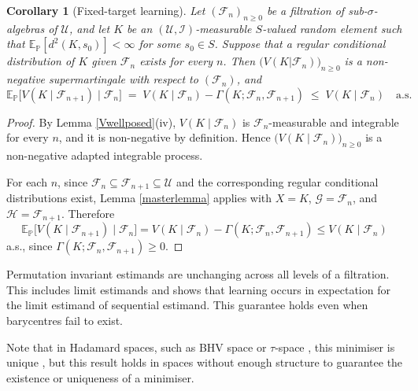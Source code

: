 \documentclass{article}
\newcommand{\E}{\mathbb{E}_{\mathbb{P}}}
\newcommand{\F}{\mathcal{F}}
\newcommand{\1}{\mathbbm{1}}
\newtheorem{cor}{Corollary}
\begin{document}
\begin{cor}[Fixed-target learning]
\label{fixedlearning}
Let $(\mathcal F_n)_{n\ge0}$ be a filtration of sub-$\sigma$-algebras of $\mathcal U$, and let $K$ be an $(\mathcal U,\mathcal I)$-measurable $S$-valued random element such that $\E[d^2(K,s_0)]<\infty$ for some $s_0\in S$. Suppose that a regular conditional distribution of $K$ given $\mathcal F_n$
exists for every $n$. Then $\big(V(K|\mathcal{F}_n)\big)_{n\ge0}$ is a non-negative supermartingale with respect to $(\mathcal{F}_n)$, and
\[
\E\big[V(K\mid\F_{n+1})\mid\F_n\big]\;=\;V(K\mid\F_n)-\Gamma(K;\F_n,\F_{n+1})\;\leq\;V(K\mid\F_n)
\quad\text{a.s.}
\]
\end{cor}

\begin{proof}
By Lemma \ref{Vwellposed}(iv), $V(K\mid\F_n)$ is $\F_n$-measurable and
integrable for every $n$, and it is non-negative by definition. Hence
$\big(V(K\mid\F_n)\big)_{n\ge0}$ is a non-negative adapted integrable
process.

For each $n$, since $\F_n\subseteq\F_{n+1}\subseteq\mathcal U$ and the
corresponding regular conditional distributions exist, Lemma
\ref{masterlemma} applies with $X=K$, $\mathcal G=\F_n$, and
$\mathcal H=\F_{n+1}$. Therefore
\[
\E\big[V(K\mid\F_{n+1})\mid\F_n\big]
=
V(K\mid\F_n)-\Gamma(K;\F_n,\F_{n+1})
\le V(K\mid\F_n)
\]
a.s., since $\Gamma(K;\F_n,\F_{n+1})\ge0$.
\end{proof}
Permutation invariant estimands are unchanging across all levels of a filtration. This includes limit estimands and shows that learning occurs in expectation for the limit estimand of sequential estimand. This guarantee holds even when barycentres fail to exist.

Note that in Hadamard spaces, such as BHV space \citep{BHV2001} or $\tau$-space  \citep{tauspace2016}, this minimiser is unique \citep{Sturm2003ProbabilityMO}, but this result holds in spaces without enough structure to guarantee the existence or uniqueness of a minimiser.
\end{document}

